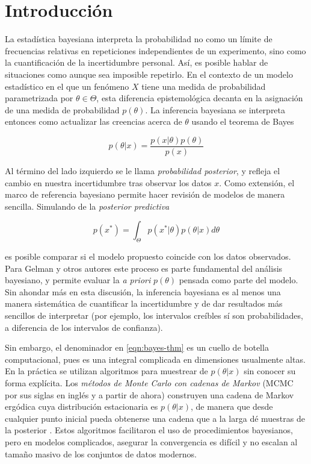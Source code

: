 \documentclass[main.tex]{subfiles}
\begin{document}
\chapter{Introducción}
La estadística bayesiana interpreta la probabilidad no como un límite de frecuencias relativas en repeticiones independientes de un experimento, sino como la cuantificación de la incertidumbre personal. Así, es posible hablar de situaciones como  aunque sea imposible repetirlo. En el contexto de un modelo estadístico en el que un fenómeno $X$ tiene una medida de probabilidad parametrizada por $\theta \in \Theta$, esta diferencia epistemológica decanta en la asignación de una medida de probabilidad $p(\theta)$. La inferencia bayesiana se interpreta entonces como actualizar las creencias acerca de $\theta$ usando el teorema de Bayes

\begin{equation}
	p(\theta | x) = \frac{p(x|\theta)p(\theta)}{p(x)}
	\label{eqn:bayes-thm}	
\end{equation}

Al término del lado izquierdo se le llama \textit{probabilidad posterior}, y refleja el cambio en nuestra incertidumbre tras observar los datos $x$. Como extensión, el marco de referencia bayesiano permite hacer revisión de modelos de manera sencilla. Simulando de la \textit{posterior predictiva} 

\begin{equation*}
	p(x^*) = \int_\Theta p(x^*|\theta)p(\theta | x) d\theta	
\end{equation*}
 
 es posible comparar si el modelo propuesto coincide con los datos observados. Para Gelman y otros autores \cite{gelman-philosphy} este proceso es parte fundamental del análisis bayesiano, y permite evaluar la \textit{a priori} $p(\theta)$ pensada como parte del modelo. Sin ahondar más en esta discusión, la inferencia bayesiana es al menos una manera sistemática de cuantificar la incertidumbre y de dar resultados más sencillos de interpretar (por ejemplo, los intervalos creíbles sí son probabilidades, a diferencia de los intervalos de confianza).

Sin embargo, el denominador en \eqref{eqn:bayes-thm} es un cuello de botella computacional, pues es una integral complicada en dimensiones usualmente altas. En la práctica se utilizan algoritmos para muestrear de $p(\theta |x)$ sin conocer su forma explícita. Los \textit{métodos de Monte Carlo con cadenas de Markov} (MCMC por sus siglas en inglés y a partir de ahora) construyen una cadena de Markov ergódica cuya distribución estacionaria es $p(\theta | x)$, de manera que desde cualquier punto inicial pueda obtenerse una cadena que a la larga dé muestras de la posterior \cite{robert-book}. Estos algoritmos facilitaron el uso de procedimientos bayesianos, pero en modelos complicados, asegurar la convergencia es difícil y no escalan al tamaño masivo de los conjuntos de datos modernos.
\end{document}
